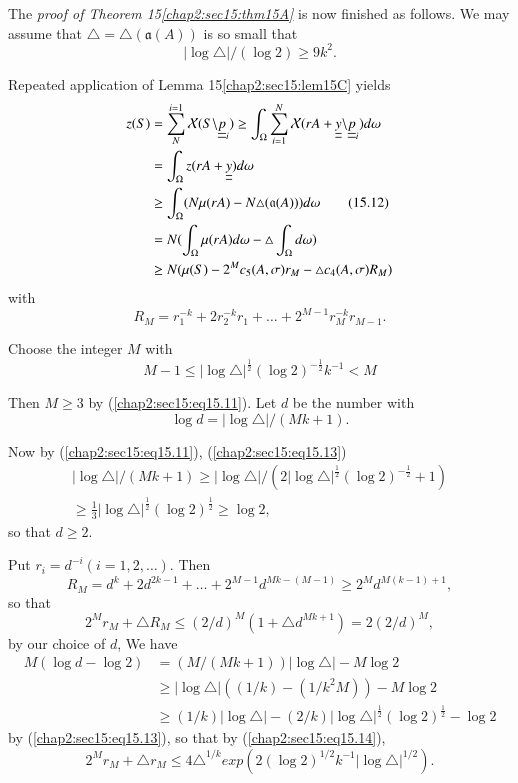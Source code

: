 The {\em proof of Theorem 15\ref{chap2:sec15:thm15A}} is now finished as follows. We may assume that $\triangle = \triangle (\mathfrak{a}(A))$ is so small that
\begin{equation*}
|\log \triangle|/ (\log 2) \geq 9k^{2}.\tag{15.11}\label{chap2:sec15:eq15.11}
\end{equation*}

Repeated application of Lemma 15\ref{chap2:sec15:lem15C} yields
\begin{align*}
z(S) & = \sum_{N}^{i=1} \mathcal{X} (S \backslash \underline{\underline{p}}_{i}) \geq \int_{\Omega} \sum_{i=1}^{N} \mathcal{X} (rA + \underline{\underline{y}} \backslash \underline{\underline{p}}_{i}) d\omega\\
& = \int_{\Omega} z(rA + \underline{\underline{y}}) d\omega\\
& \geq \int_{\Omega} (N \mu(rA) - N\triangle(\mathfrak{a}(A))) d\omega\tag{15.12}\label{chap2:sec15:eq15.12}\\
& = N(\int_{\Omega} \mu(rA) d\omega - \triangle \int_{\Omega} d\omega)\\
& \geq N(\mu(S) - 2^{M} c_{5} (A, \sigma) r_{M} - \triangle c_{4} (A, \sigma) R_{M})\\
\end{align*}\pageoriginale
with
$$
R_{M} = r_{1}^{-k} + 2r_{2}^{-k} r_{1} + \ldots + 2^{M-1} r_{M}^{-k} r_{M-1}.
$$

Choose the integer $M$ with
\begin{equation*}
M - 1 \leq |\log \triangle|^{\frac{1}{2}} (\log 2)^{-\frac{1}{2}} k^{-1} < M\tag{15.13}\label{chap2:sec15:eq15.13}
\end{equation*}

Then $M \geq 3$ by (\ref{chap2:sec15:eq15.11}). Let $d$ be the number with
$$
\log d = |\log \triangle|/ (Mk + 1).
$$

Now by (\ref{chap2:sec15:eq15.11}), (\ref{chap2:sec15:eq15.13})
\begin{multline*}
|\log \triangle|/ (Mk+1) \geq |\log \triangle|/ (2|\log \triangle|^{\frac{1}{2}} (\log 2)^{-\frac{1}{2}} + 1) \\
\geq \frac{1}{3} |\log \triangle|^{\frac{1}{2}} (\log 2)^{\frac{1}{2}} \geq \log 2,
\end{multline*}
so that $d \geq 2$.

Put $r_{i} = d^{-i} (i = 1, 2, \ldots)$. Then
$$
R_{M} = d^{k} + 2d^{2k-1} + \ldots + 2^{M-1} d^{Mk-(M-1)} \geq 2^{M} d^{M(k-1)+1},
$$
so that
\begin{equation*}
  2^{M} r_{M} + \triangle R_{M} \leq (2/d)^{M} (1 + \triangle d^{Mk+1}) = 2(2/d)^{M},\tag{15.14}\label{chap2:sec15:eq15.14}
\end{equation*}
by our choice of $d$, We have
\begin{align*}
M(\log d - \log 2) & = (M/ (Mk + 1)) |\log \triangle| - M \log 2\\
& \geq |\log \triangle| ((1/k) - (1/k^{2} M)) - M \log 2\\
& \geq (1/k) |\log \triangle| - (2/k) |\log \triangle|^{\frac{1}{2}} (\log 2)^{\frac{1}{2}} - \log 2
\end{align*}\pageoriginale
by (\ref{chap2:sec15:eq15.13}), so that by (\ref{chap2:sec15:eq15.14}),
$$
2^{M} r_{M} + \triangle r_{M} \leq 4 \triangle^{1/k} exp (2(\log 2)^{1/2} k^{-1} |\log \triangle|^{1/2}).
$$

